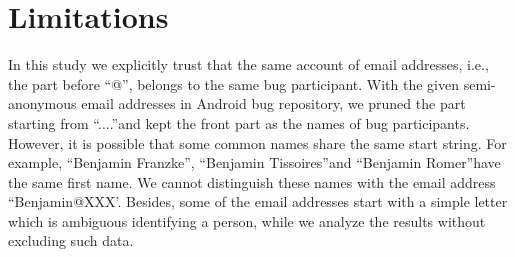 \documentclass[10pt, conference, compsocconf]{IEEEtran}
\begin{document}
%
%





\section{Limitations}
\label{limitation}
In this study we explicitly trust that the same account of email addresses, i.e., the part before \textquotedblleft @\textquotedblright, belongs to the same bug participant. With the given semi-anonymous email addresses in Android bug repository, we pruned the part starting from \textquotedblleft ....\textquotedblright  and kept the front part as the names of bug participants. However, it is possible that some common names share the same start string. For example, \textquotedblleft Benjamin Franzke\textquotedblright, \textquotedblleft Benjamin Tissoires\textquotedblright  and \textquotedblleft Benjamin Romer\textquotedblright  have the same first name. We cannot distinguish these names with the email address \textquotedblleft Benjamin@XXX'. Besides, some of the email addresses start with a simple letter which is ambiguous identifying a person, while we analyze the results without excluding such data.
\end{document}
